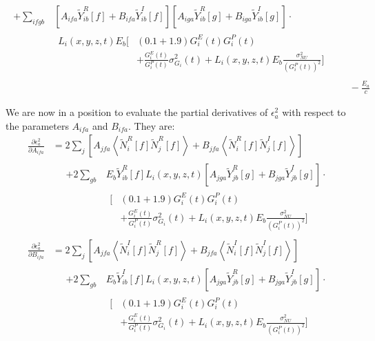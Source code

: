 \begin{align*}
\begin{aligned}
  + \sum_{ifgb} &\left[A_{ifa} \widetilde{Y}_{ib}^R[f] + B_{ifa} \widetilde{Y}_{ib}^I[f]\right]\left[A_{iga} \widetilde{Y}_{ib}^R[g] + B_{iga} \widetilde{Y}_{ib}^I[g]\right] \cdot \\
  & \begin{aligned}
    L_i(x,y,z,t) E_b \bigg[ &(0.1 + 1.9) G^E_i(t) G^P_i(t) \\
    & + \frac{G^E_i(t)}{G^P_i(t)} \sigma^2_{G_i}(t) + L_i(x,y,z,t) E_b \frac{\sigma^2_{NU}}{\left(G^P_i(t)\right)^2} \bigg]
\end{aligned} \end{aligned} \\
&\quad - \frac{E_a}{c}
\end{align*}

We are now in a position to evaluate the partial derivatives of $\epsilon^2_a$ with respect to the parameters $A_{ifa}$ and $B_{ifa}$.  They are:
\begin{align*}
\frac{\partial \epsilon^2_a}{\partial A_{ifa}} &= 2 \sum_j \left[ A_{jfa} \left<\widetilde{N}_i^R[f]\widetilde{N}_j^R[f]\right> + B_{jfa} \left<\widetilde{N}_i^R[f]\widetilde{N}_j^I[f]\right>\right] \\
&\quad \begin{aligned}
  + 2 \sum_{gb} & E_b\widetilde{Y}_{ib}^R[f] L_i(x,y,z,t)\left[A_{jga} \widetilde{Y}_{jb}^R[g] + B_{jga} \widetilde{Y}_{jb}^I[g]\right] \cdot \\
  & \begin{aligned}
    \bigg[ &(0.1 + 1.9) G^E_i(t) G^P_i(t) \\
  & + \frac{G^E_i(t)}{G^P_i(t)} \sigma^2_{G_i}(t) + L_i(x,y,z,t) E_b \frac{\sigma^2_{NU}}{\left(G^P_i(t)\right)^2} \bigg]
\end{aligned} \end{aligned}\\
%
\frac{\partial \epsilon^2_a}{\partial B_{ifa}} &= 2 \sum_j \left[ A_{jfa} \left<\widetilde{N}_i^I[f]\widetilde{N}_j^R[f]\right> + B_{jfa} \left<\widetilde{N}_i^I[f]\widetilde{N}_j^I[f]\right>\right] \\
&\quad \begin{aligned}
  + 2 \sum_{gb} & E_b\widetilde{Y}_{ib}^I[f] L_i(x,y,z,t)\left[A_{jga} \widetilde{Y}_{jb}^R[g] + B_{jga} \widetilde{Y}_{jb}^I[g]\right] \cdot \\
  & \begin{aligned}
    \bigg[ &(0.1 + 1.9) G^E_i(t) G^P_i(t) \\
  & + \frac{G^E_i(t)}{G^P_i(t)} \sigma^2_{G_i}(t) + L_i(x,y,z,t) E_b \frac{\sigma^2_{NU}}{\left(G^P_i(t)\right)^2} \bigg]
\end{aligned} \end{aligned}
\end{align*}








